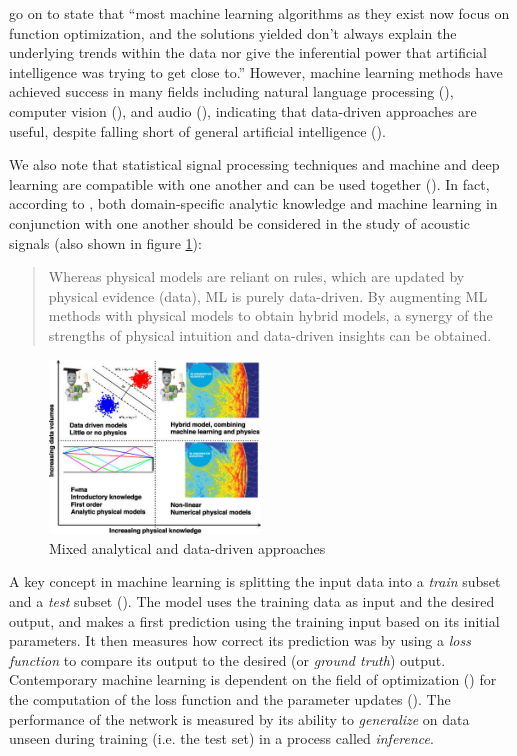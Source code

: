 \documentclass[report.tex]{subfiles}
\begin{document}
\textcite{introtodl} go on to state that ``most machine learning algorithms as they exist now focus on function optimization, and the solutions yielded don't always explain the underlying trends within the data nor give the inferential power that artificial intelligence was trying to get close to.'' However, machine learning methods have achieved success in many fields including natural language processing (\cite{nlpml}), computer vision (\cite{cvml}), and audio (\cite{audiodeeplearning}), indicating that data-driven approaches are useful, despite falling short of general artificial intelligence (\cite{generalai}).

We also note that statistical signal processing techniques and machine and deep learning are compatible with one another and can be used together (\cite{mlsp1, mlsp2}). In fact, according to \textcite{mldspmix}, both domain-specific analytic knowledge and machine learning in conjunction with one another should be considered in the study of acoustic signals (also shown in figure \ref{fig:dspmlmix}):

\begin{quote}
	Whereas physical models are reliant on rules, which are updated by physical evidence (data), ML is purely data-driven. By augmenting ML methods with physical models to obtain hybrid models, a synergy of the strengths of physical intuition and data-driven insights can be obtained.
\end{quote}

\begin{figure}[ht]
	\centering
	\includegraphics[width=0.5\textwidth]{./images-neural/dspmlmix.jpg}
	\caption{Mixed analytical and data-driven approaches}
	\label{fig:dspmlmix}
\end{figure}

A key concept in machine learning is splitting the input data into a \textit{train} subset and a \textit{test} subset (\cite{introtoml}). The model uses the training data as input and the desired output, and makes a first  prediction using the training input based on its initial parameters. It then measures how correct its prediction was by using a \textit{loss function} to compare its output to the desired (or \textit{ground truth}) output. Contemporary machine learning is dependent on the field of optimization (\cite{boyd2004convex, mlopt1, mlopt2}) for the computation of the loss function and the parameter updates (\cite{sgd}). The performance of the network is measured by its ability to \textit{generalize} on data unseen during training (i.e. the test set) in a process called \textit{inference}.
\end{document}
